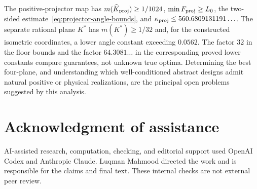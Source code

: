 \documentclass[12pt]{article}
\theoremstyle{definition}
\theoremstyle{remark}
\begin{document}
The positive-projector map has
$m(\widehat K_{\rm proj})\geq1/1024$, $\min F_{\rm proj}\geq L_0$, the
two-sided estimate~\eqref{eq:projector-angle-bounds}, and
$\kappa_{\rm proj}\leq560.6809131191\ldots$.  The separate rational plane
$K^\ast$ has $m(K^\ast)\geq1/32$ and, for the constructed isometric
coordinates, a lower angle constant exceeding $0.0562$.  The factor $32$ in
the floor bounds and the factor $64.3081\ldots$ in the corresponding proved
lower constants compare guarantees, not unknown true optima.  Determining the
best four-plane, and understanding which well-conditioned abstract designs
admit natural positive or physical realizations, are the principal open
problems suggested by this analysis.

\section*{Acknowledgment of assistance}
AI-assisted research, computation, checking, and editorial support used
OpenAI Codex and Anthropic Claude. Luqman Mahmood directed the work
and is responsible for the claims and final text. These internal
checks are not external peer review.

\begingroup
\small


\endgroup
\end{document}
